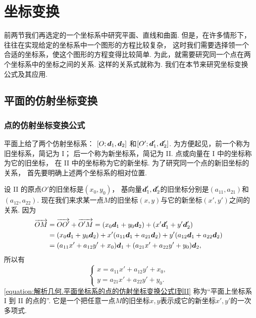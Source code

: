 \section{坐标变换}
前两节我们再选定的一个坐标系中研究平面、直线和曲面.
但是，在许多情形下，往往在实现给定的坐标系中一个图形的方程比较复杂，
这时我们需要选择领一个合适的坐标系，使这个图形的方程变得比较简单.
为此，就需要研究同一个点在两个坐标系中的坐标之间的关系.
这样的关系式就称为.
我们在本节来研究坐标变换公式及其应用.

\subsection{平面的仿射坐标变换}
\subsubsection{点的仿射坐标变换公式}
平面上给了两个仿射坐标系：
\([O;\boldsymbol{d}_1,\boldsymbol{d}_2]\)
和\([O';\boldsymbol{d}_1',\boldsymbol{d}_2']\).
为方便起见，前一个称为旧坐标系，简记为 I；
后一个称为新坐标系，简记为 II.
点或向量在 I 中的坐标称为它的旧坐标，
在 II 中的坐标称为它的新坐标.
为了研究同一个点的新旧坐标的关系，
首先要明确上述两个坐标系的相对位置.

设 II 的原点\(O'\)的旧坐标是\((x_0,y_0)\)，
基向量\(\boldsymbol{d}_1',\boldsymbol{d}_2'\)的旧坐标分别是\((a_{11},a_{21})\)和\((a_{12},a_{22})\).
现在我们来求某一点\(M\)的旧坐标\((x,y)\)与它的新坐标\((x',y')\)之间的关系.
因为\begin{align*}
	\overrightarrow{OM}
	&= \overrightarrow{O O'} + \overrightarrow{O' M}
	= (x_0 \boldsymbol{d}_1 + y_0 \boldsymbol{d}_2)
	+ (x' \boldsymbol{d}_1' + y' \boldsymbol{d}_2') \\
	&= (x_0 \boldsymbol{d}_1 + y_0 \boldsymbol{d}_2)
	+ x' (a_{11} \boldsymbol{d}_1 + a_{21} \boldsymbol{d}_2)
	+ y' (a_{12} \boldsymbol{d}_1 + a_{22} \boldsymbol{d}_2) \\
	&= (a_{11} x' + a_{12} y' + x_0) \boldsymbol{d}_1
	+ (a_{21} x' + a_{22} y' + y_0) \boldsymbol{d}_2,
\end{align*}
所以有\begin{equation}\label{equation:解析几何.平面坐标系的点的仿射坐标变换公式I到II}
	\left\{ \begin{array}{l}
		x = a_{11} x' + a_{12} y' + x_0, \\
		y = a_{21} x' + a_{22} y' + y_0.
	\end{array} \right.
\end{equation}
\cref{equation:解析几何.平面坐标系的点的仿射坐标变换公式I到II}
称为“平面上坐标系 I 到 II 的点的”.
它是一个把任意一点\(M\)的旧坐标\(x,y\)表示成它的新坐标\(x',y'\)的一次多项式.

